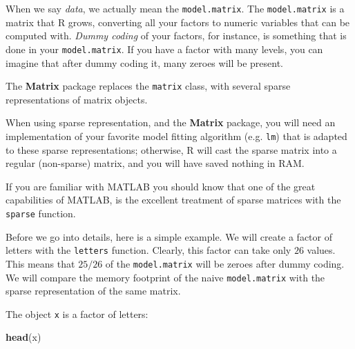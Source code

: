 \documentclass[]{book}
\newenvironment{Shaded}{\begin{snugshade}}{\end{snugshade}}
\newcommand{\KeywordTok}[1]{\textcolor[rgb]{0.13,0.29,0.53}{\textbf{#1}}}
\newcommand{\DataTypeTok}[1]{\textcolor[rgb]{0.13,0.29,0.53}{#1}}
\newcommand{\FloatTok}[1]{\textcolor[rgb]{0.00,0.00,0.81}{#1}}
\newcommand{\StringTok}[1]{\textcolor[rgb]{0.31,0.60,0.02}{#1}}
\newcommand{\CommentTok}[1]{\textcolor[rgb]{0.56,0.35,0.01}{\textit{#1}}}
\newcommand{\OtherTok}[1]{\textcolor[rgb]{0.56,0.35,0.01}{#1}}
\newcommand{\OperatorTok}[1]{\textcolor[rgb]{0.81,0.36,0.00}{\textbf{#1}}}
\newcommand{\NormalTok}[1]{#1}
\theoremstyle{definition}
\theoremstyle{definition}
\theoremstyle{definition}
\theoremstyle{remark}
\let\BeginKnitrBlock\begin \let\EndKnitrBlock\end
\begin{document}
When we say \emph{data}, we actually mean the \texttt{model.matrix}. The
\texttt{model.matrix} is a matrix that R grows, converting all your
factors to numeric variables that can be computed with. \emph{Dummy
coding} of your factors, for instance, is something that is done in your
\texttt{model.matrix}. If you have a factor with many levels, you can
imagine that after dummy coding it, many zeroes will be present.

The \textbf{Matrix} package replaces the \texttt{matrix} class, with
several sparse representations of matrix objects.

When using sparse representation, and the \textbf{Matrix} package, you
will need an implementation of your favorite model fitting algorithm
(e.g. \texttt{lm}) that is adapted to these sparse representations;
otherwise, R will cast the sparse matrix into a regular (non-sparse)
matrix, and you will have saved nothing in RAM.

\BeginKnitrBlock{remark}
{}If you are familiar with MATLAB you should
know that one of the great capabilities of MATLAB, is the excellent
treatment of sparse matrices with the \texttt{sparse} function.
\EndKnitrBlock{remark}

Before we go into details, here is a simple example. We will create a
factor of letters with the \texttt{letters} function. Clearly, this
factor can take only \(26\) values. This means that \(25/26\) of the
\texttt{model.matrix} will be zeroes after dummy coding. We will compare
the memory footprint of the naive \texttt{model.matrix} with the sparse
representation of the same matrix.

\begin{Shaded}
\end{Shaded}

The object \texttt{x} is a factor of letters:

\begin{Shaded}
\begin{Highlighting}[]
\KeywordTok{head}\NormalTok{(x)}
\end{Highlighting}
\end{Shaded}
\end{document}
